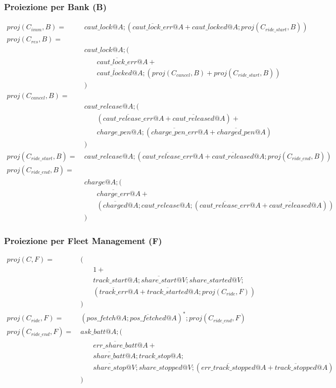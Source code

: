 \subsubsection{Proiezione per Bank (B)}
\begin{align*}
proj(C_{imm}, B) = & \ caut\_lock@A ; (\overline{caut\_lock\_err}@A + \overline{caut\_locked}@A ; proj(C_{ride\_start}, B) ) \\
proj(C_{res}, B) = \\
& \ caut\_lock@A ; ( \\
& \quad \quad \overline{caut\_lock\_err}@A + \\
& \quad \quad \overline{caut\_locked}@A ; (proj(C_{cancel}, B) + proj(C_{ride\_start}, B)) \\
& \ ) \\
proj(C_{cancel}, B) = \\
& \ caut\_release@A ; ( \\
& \quad \quad (\overline{caut\_release\_err}@A + \overline{caut\_released}@A) + \\
& \quad \quad charge\_pen@A ; (\overline{charge\_pen\_err}@A + \overline{charged\_pen}@A) \\
& \ ) \\
proj(C_{ride\_start}, B) = & \ caut\_release@A ; ( \overline{caut\_release\_err}@A + \overline{caut\_released}@A ; proj(C_{ride\_end}, B) ) \\
proj(C_{ride\_end}, B) = \\
& \ charge@A ; ( \\
& \quad \quad \overline{charge\_err}@A + \\
& \quad \quad ( \overline{charged}@A ; caut\_release@A ; ( \overline{caut\_release\_err}@A + \overline{caut\_released}@A ) ) \\
& \ )
\end{align*}

\subsubsection{Proiezione per Fleet Management (F)}
\begin{align*}
proj(C, F) = & \ ( \\
& \quad \quad 1 + \\
& \quad \quad track\_start@A ; \overline{share\_start}@V ; share\_started@V ; \\
& \quad \quad (\overline{track\_err}@A + \overline{track\_started}@A ; proj(C_{ride}, F) ) \\
& \ ) \\
proj(C_{ride}, F) = & \ (pos\_fetch@A ; \overline{pos\_fetched}@A )^* ; proj(C_{ride\_end}, F) \\
proj(C_{ride\_end}, F) = & \ ask\_batt@A ; ( \\
& \quad \quad \overline{err\_share\_batt}@A + \\
& \quad \quad \overline{share\_batt}@A ; track\_stop@A ; \\
& \quad \quad \overline{share\_stop}@V ; share\_stopped@V ; (\overline{err\_track\_stopped}@A + \overline{track\_stopped}@A ) \\
& \ )
\end{align*}

